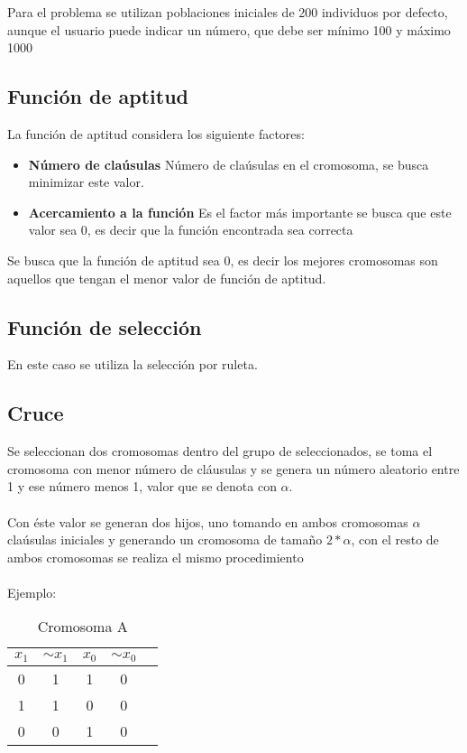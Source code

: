 \documentclass[a4paper]{article}
\begin{document}
Para el problema se utilizan poblaciones iniciales de 200 individuos por defecto, aunque el usuario puede indicar un número, que debe ser mínimo 100 y máximo 1000

\subsection{Función de aptitud}

La función de aptitud considera los siguiente factores:

\begin{itemize}
	\item \textbf{Número de claúsulas} Número de claúsulas en el cromosoma, se busca minimizar este valor.
	\item \textbf{Acercamiento a la función} Es el factor más importante se busca que este valor sea 0, es decir que la función encontrada sea correcta
\end{itemize}

Se busca que la función de aptitud sea 0, es decir los mejores cromosomas son aquellos que tengan el menor valor de función de aptitud.

\subsection{Función de selección}

En este caso se utiliza la selección por ruleta.

\subsection{Cruce}

Se seleccionan dos cromosomas dentro del grupo de seleccionados, se toma el cromosoma con menor número de cláusulas y se genera un número aleatorio entre 1 y ese número menos 1, valor que se denota con $\alpha$.
\\\\
Con éste valor se generan dos hijos, uno tomando en ambos cromosomas $\alpha$ claúsulas iniciales y generando un cromosoma de tamaño $2*\alpha$, con el resto de ambos cromosomas se realiza el mismo procedimiento
\\\\
Ejemplo:

\begin{table}[H]
	\centering
	\caption{Cromosoma A}
	\begin{tabular}{|c | c | c|  c|  c|}
		\hline
		$x_1$ & $ \sim{x_1}$ & $x_0$ & $ \sim{x_0}$\\
		\hline
		0 & 1& 1 & 0\\
		\hline
		1 & 1& 0 & 0\\
		\hline
		0 & 0& 1 & 0\\
		\hline
	\end{tabular}
\end{table}
\end{document}
